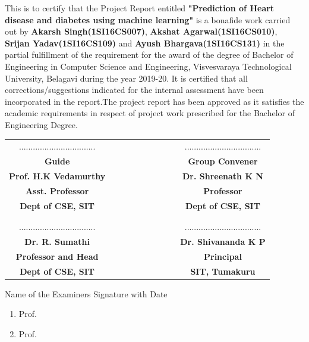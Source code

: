 \begin{large}
This is to certify that the Project Report entitled 
\textbf{"Prediction of Heart disease and diabetes using machine learning"} 
is a bonafide work carried out by 
\textbf{Akarsh Singh(1SI16CS007)}, 
\textbf{Akshat Agarwal(1SI16CS010)}, 
\textbf{Srijan Yadav(1SI16CS109)} 
and 
\textbf{Ayush Bhargava(1SI16CS131)} 
in the partial fulfillment of the requirement for the award of 
the degree of Bachelor of Engineering in Computer Science and Engineering, 
Visvesvaraya Technological University, Belagavi during the year 2019-20. 
It is certified that all corrections/suggestions indicated for the internal 
assessment have been incorporated in the report.The project report has been 
approved as it satisfies the academic requirements in respect of project 
work prescribed for the Bachelor of Engineering Degree.
\end{large}
\vfill
\vfill
\vfill

\begin{table}[h!]
\centering
\begin{tabular}{cccccccccc}
.................................&&&&&&&&& .................................\\
\textbf{{\footnotesize Guide}} &&&&&&&&&\textbf{{\footnotesize Group Convener}}\\
\textbf{Prof. H.K Vedamurthy}&&&&&&&&& \textbf{Dr. Shreenath K N} \\
\textbf{{\footnotesize Asst. Professor}} &&&&&&&&& \textbf{{\footnotesize Professor}}\\
\textbf{{\footnotesize Dept of CSE, SIT}} &&&&&&&&& \textbf{{\footnotesize Dept of CSE, SIT}}\\
\\
\\
.................................&&&&&&&&& .................................\\
\textbf{Dr. R. Sumathi} &&&&&&&&&  \textbf{Dr. Shivananda K P} \\ 
\textbf{{\footnotesize Professor and Head}} &&&&&&&&&  \textbf{{\footnotesize Principal}} \\
\textbf{{\footnotesize Dept of CSE, SIT}} &&&&&&&&&  \textbf{{\footnotesize SIT, Tumakuru}}\\

\end{tabular} 

\end{table}
Name of the Examiners	\hfill	Signature with Date
\begin{small}
\begin{enumerate}
\item Prof.
\item Prof.
\end{enumerate}
\end{small}
